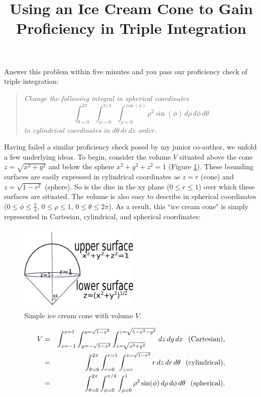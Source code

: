 \documentclass[12pt,fleqn]{article}
\title{Using an Ice Cream Cone to Gain Proficiency in Triple Integration}
\author{}
\date{}
\begin{document}
\maketitle
\doublespacing
             Answer this problem within five minutes and you pass our proficiency check of triple integration:

\begin{quote}
\emph{Change the following integral in spherical coordinates
\begin{displaymath}
\int_{\theta=0}^{2\pi}\int_{\phi=0}^{\pi/4} \int_{\rho=0}^{\cos(\phi)} \rho^2\sin(\phi) \,d\rho\,d\phi\,d\theta
 \end{displaymath}
 {\flushleft to} cylindrical coordinates in $d\theta\,dr\,dz$ order.}
\end{quote}

Having failed a similar proficiency check posed by my junior co-author, we  unfold a few underlying ideas.    
    To begin, consider the volume $V$ situated above the cone $z=\sqrt{x^2+y^2}$ and below the sphere $x^2+y^2+z^2=1$ (Figure \ref{ic1}).   These bounding surfaces are easily expressed in cylindrical coordinates as $z=r$ (cone) and $z=\sqrt{1-r^2}$ (sphere). So is the disc in the xy plane ($0\le r\le1$) over which these surfaces are situated. The volume is also easy to describe in spherical coordinates ($0\le \phi\le \frac{\pi}{4}$, $0\le \rho \le 1$, $0\le\theta\le 2\pi$).  As a result, this ``ice cream cone" is simply represented in Cartesian, cylindrical, and spherical coordinates:
              \begin{figure}[!htpb]
    \centering
        \includegraphics [width=2.25in, height=1.65in]{ic1.eps}
    \caption{Simple ice cream cone with volume $V$.}
    \label{ic1}
\end{figure}
             
          
\begin{eqnarray*}
V &= &  \int_{x=-1}^{x=1} \int_{y=-\sqrt{1-x^2}}^{y=\sqrt{1-x^2}}\int_{z=\sqrt{x^2+y^2}}^{z=\sqrt{1-x^2-y^2}}\,dz\,dy\,dx  \hspace{.1in} \textup{(Cartesian),}\\
&=&\int_{\theta=0}^{2\pi}\int_{r=0}^{r=1} \int_{z=r}^{z=\sqrt{1-r^2}} r \,dz\,dr\,d\theta \hspace{.1in} \textup{(cylindrical),}\\
& = &\int_{\theta=0}^{2\pi}\int_{\phi=0}^{\pi/4} \int_{\rho=0}^{1} \rho^2\sin(\phi) \,d\rho\,d\phi\,d\theta \hspace{.1in} \textup{(spherical)}.
\end{eqnarray*}
\end{document}
